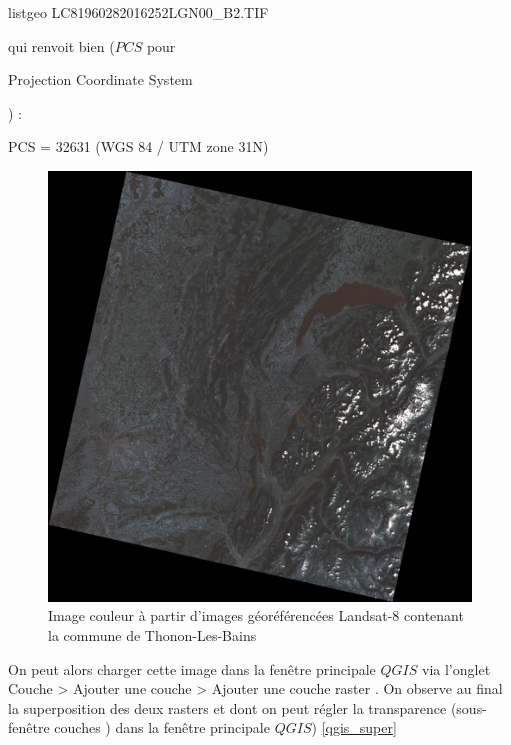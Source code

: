 \documentclass{book}
\begin{document}
\begin{center}
listgeo LC81960282016252LGN00\_B2.TIF
\end{center}

qui renvoit bien ($PCS$ pour \begin{itshape}Projection Coordinate System\end{itshape}) :\\

\begin{center}
PCS = 32631 (WGS 84 / UTM zone 31N)\\
\end{center}

\begin{figure}[H]
\begin{center}
\includegraphics[scale=0.4]{images/georeferencing/Thonon_landsat.png}
\end{center}
\caption{Image couleur à partir d'images géoréférencées Landsat-8 contenant la commune de Thonon-Les-Bains}
\label{Thonon-landsat}
\end{figure}

\clearpage

On peut alors charger cette image dans la fenêtre principale $QGIS$ via l'onglet \og Couche > Ajouter une couche > Ajouter une couche 
raster \fg{}. On observe au final la superposition des deux rasters et dont on peut régler la transparence (sous-fen\^{e}tre \og couches \fg{}) 
dans la fen\^{e}tre principale $QGIS$) \ref{qgis_super}
\end{document}

